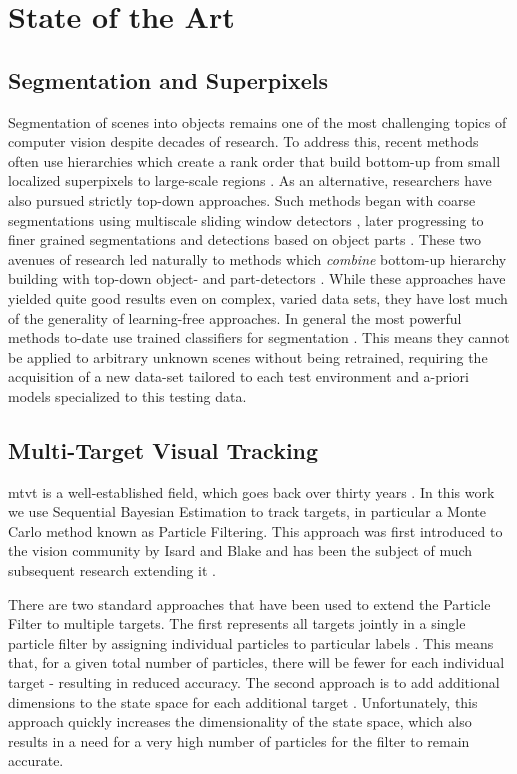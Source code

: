 \section{State of the Art}
\subsection{Segmentation and Superpixels}
Segmentation of scenes into objects remains one of the most challenging topics of computer vision despite decades of research. To address this, recent methods often use hierarchies which create a rank order that build bottom-up from small localized superpixels to large-scale regions \cite{Ren:ICCV2003,Ahuja:CVPR2008,Arbelaez:PAMI2011}. As an alternative, researchers have also pursued strictly top-down approaches. Such methods began with coarse segmentations using multiscale sliding window detectors \cite{ViolaJones:IJCV2004}, later progressing to finer grained segmentations and detections based on object parts \cite{Felzenswalb:PAMI2010, Bourdev:ICCV2009}. These two avenues of research led naturally to methods which {\em combine} bottom-up hierarchy building with top-down object- and part-detectors \cite{Arbelaez:CVPR2012, Silberman:ECCV12, Gupta:CVPR2013}. While these approaches have yielded quite good results even on complex, varied data sets, they have lost much of the generality of learning-free approaches. In general the most powerful methods to-date use trained classifiers for segmentation \cite{Silberman:ECCV12, Gupta:CVPR2013}. This means they cannot be applied to arbitrary unknown scenes without being retrained, requiring the acquisition of a new data-set tailored to each test environment and a-priori models specialized to this testing data.

\subsection{Multi-Target Visual Tracking}
\gls{mtvt} is a well-established field, which goes back over thirty years \cite{MTT_JPDA}. In this work we use  Sequential Bayesian Estimation to track targets, in particular a Monte Carlo method known as Particle Filtering. This approach was first introduced to the vision community by Isard and Blake \cite{Condensation98} and has been the subject of much subsequent research extending it \cite{TrackingMultipleParticleFiltering,MonteCarloMTT,SequentialMonteCarloMultitargetFiltering}.

There are two standard approaches that have been used to extend the Particle Filter to multiple targets. The first represents all targets jointly in a single particle filter by assigning individual particles to particular labels \cite{MultiMixtureTracking03}. This means that, for a given total number of particles, there will be fewer for each individual target - resulting in reduced accuracy. The second approach is to add additional dimensions to the state space for each additional target \cite{TrackMultTargets01}. Unfortunately, this approach quickly increases the dimensionality of the state space, which also results in a need for a very high number of particles for the filter to remain accurate. 

